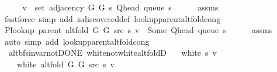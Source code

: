 \begin{isabellebody}
%
\isadelimproof
%
\endisadelimproof
%
\isatagproof
{}\isamarkupfalse%
\ {\isacharminus}{\kern0pt}\isanewline
\ \ \isamarkupfalse%
\ {\isachardoublequoteopen}v\ {\isasymin}\ set\ {\isacharparenleft}{\kern0pt}adjacency\ G{}\ G{}\ s\ {\isacharparenleft}{\kern0pt}Q{\isacharunderscore}{\kern0pt}head\ {\isacharparenleft}{\kern0pt}queue\ s{\isacharparenright}{\kern0pt}{\isacharparenright}{\kern0pt}{\isacharparenright}{\kern0pt}{\isachardoublequoteclose}\isanewline
\ \ \ \ \isamarkupfalse%
\ assms\isanewline
\ \ \ \ \isamarkupfalse%
\ {\isacharparenleft}{\kern0pt}fastforce\ simp\ add{\isacharcolon}{\kern0pt}\ is{\isacharunderscore}{\kern0pt}discovered{\isacharunderscore}{\kern0pt}def\ lookup{\isacharunderscore}{\kern0pt}parent{\isacharunderscore}{\kern0pt}alt{\isacharunderscore}{\kern0pt}fold{\isacharunderscore}{\kern0pt}cong{\isacharparenright}{\kern0pt}\isanewline
\ \ \isamarkupfalse%
\ {\isachardoublequoteopen}P{\isacharunderscore}{\kern0pt}lookup\ {\isacharparenleft}{\kern0pt}parent\ {\isacharparenleft}{\kern0pt}alt{\isacharunderscore}{\kern0pt}fold\ G{}\ G{}\ src\ s{\isacharparenright}{\kern0pt}{\isacharparenright}{\kern0pt}\ v\ {\isacharequal}{\kern0pt}\ Some\ {\isacharparenleft}{\kern0pt}Q{\isacharunderscore}{\kern0pt}head\ {\isacharparenleft}{\kern0pt}queue\ s{\isacharparenright}{\kern0pt}{\isacharparenright}{\kern0pt}{\isachardoublequoteclose}\isanewline
\ \ \ \ \isamarkupfalse%
\ assms\isanewline
\ \ \ \ \isamarkupfalse%
\ {\isacharparenleft}{\kern0pt}auto\ simp\ add{\isacharcolon}{\kern0pt}\ lookup{\isacharunderscore}{\kern0pt}parent{\isacharunderscore}{\kern0pt}alt{\isacharunderscore}{\kern0pt}fold{\isacharunderscore}{\kern0pt}cong{\isacharparenright}{\kern0pt}\isanewline
{}\isamarkupfalse%
%
\endisatagproof
{\isafoldproof}%
%
\isadelimproof
\isanewline
%
\endisadelimproof
\isanewline
{}\isamarkupfalse%
\ {\isacharparenleft}{\kern0pt}\ alt{\isacharunderscore}{\kern0pt}bfs{\isacharunderscore}{\kern0pt}invar{\isacharunderscore}{\kern0pt}not{\isacharunderscore}{\kern0pt}DONE{\isacharparenright}{\kern0pt}\ white{\isacharunderscore}{\kern0pt}not{\isacharunderscore}{\kern0pt}white{\isacharunderscore}{\kern0pt}alt{\isacharunderscore}{\kern0pt}foldD{\isacharunderscore}{\kern0pt}{}{\isacharcolon}{\kern0pt}\isanewline
\ \ \ {\isachardoublequoteopen}white\ s\ v{\isachardoublequoteclose}\isanewline
\ \ \ {\isachardoublequoteopen}{\isasymnot}\ white\ {\isacharparenleft}{\kern0pt}alt{\isacharunderscore}{\kern0pt}fold\ G{}\ G{}\ src\ s{\isacharparenright}{\kern0pt}\ v{\isachardoublequoteclose}\isanewline

\end{isabellebody}
